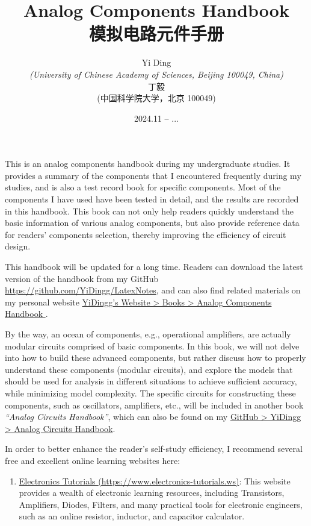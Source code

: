 \documentclass[UTF8]{report}
\title{Analog Components Handbook\\ 模拟电路元件手册}
\author{Yi Ding \\ \footnotesize \textit{(University of Chinese Academy of Sciences, Beijing 100049, China)}\\ 丁毅\\ \footnotesize {\kaishu (中国科学院大学，北京 100049)}}
\date{\footnotesize 2024.11 -- ...}
\begin{document}
 

    \maketitle\newpage  
    \thispagestyle{fancy}   %

\begin{enabstract}
    This is an analog components handbook during my undergraduate studies. It provides a summary of the components that I encountered frequently during my studies, and is also a test record book for specific components. Most of the components I have used have been tested in detail, and the results are recorded in this handbook. This book can not only help readers quickly understand the basic information of various analog components, but also provide reference data for readers' components selection, thereby improving the efficiency of circuit design.

    This handbook will be updated for a long time. Readers can download the latest version of the handbook from my GitHub \href{https://github.com/YiDingg/LatexNotes}{https://github.com/YiDingg/LatexNotes}, and can also find related materials on my personal website %
    \href{http://localhost:3000/\#/Books/Analog\%20Components\%20Handbook
    }{ %
    YiDingg's Website > Books > Analog Components Handbook
    }.

    

    By the way, an ocean of components, e.g., operational amplifiers, are actually modular circuits comprised of basic components. In this book, we will not delve into how to build these advanced components, but rather discuss how to properly understand these components (modular circuits), and explore the models that should be used for analysis in different situations to achieve sufficient accuracy, while minimizing model complexity. The specific circuits for constructing these components, such as oscillators, amplifiers, etc., will be included in another book \textit{``Analog Circuits Handbook''}, which can also be found on my \href{https://github.com/YiDingg/LatexNotes/tree/main/%5BNotes%5D%20Electornic%20Circuits%20Manual}{GitHub > YiDingg > Analog Circuits Handbook}. 
    
    In order to better enhance the reader's self-study efficiency, I recommend several free and excellent online learning websites here: 
    \begin{enumerate}
    \item \href{https://www.electronics-tutorials.ws}{Electronics Tutorials {\color{black} (https://www.electronics-tutorials.ws)}}: This website provides a wealth of electronic learning resources, including Transistors, Amplifiers, Diodes, Filters, and many practical tools for electronic engineers, such as an online resistor, inductor, and capacitor calculator.
    

\end{enumerate}
\end{enabstract}
\end{document}
